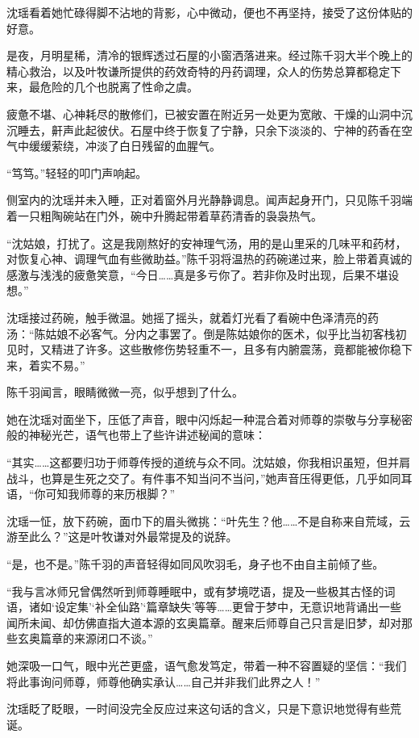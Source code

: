 沈瑶看着她忙碌得脚不沾地的背影，心中微动，便也不再坚持，接受了这份体贴的好意。

是夜，月明星稀，清冷的银辉透过石屋的小窗洒落进来。经过陈千羽大半个晚上的精心救治，以及叶牧谦所提供的药效奇特的丹药调理，众人的伤势总算都稳定下来，最危险的几个也脱离了性命之虞。

疲惫不堪、心神耗尽的散修们，已被安置在附近另一处更为宽敞、干燥的山洞中沉沉睡去，鼾声此起彼伏。石屋中终于恢复了宁静，只余下淡淡的、宁神的药香在空气中缓缓萦绕，冲淡了白日残留的血腥气。

“笃笃。”轻轻的叩门声响起。

侧室内的沈瑶并未入睡，正对着窗外月光静静调息。闻声起身开门，只见陈千羽端着一只粗陶碗站在门外，碗中升腾起带着草药清香的袅袅热气。

“沈姑娘，打扰了。这是我刚熬好的安神理气汤，用的是山里采的几味平和药材，对恢复心神、调理气血有些微助益。”陈千羽将温热的药碗递过来，脸上带着真诚的感激与浅浅的疲惫笑意，“今日……真是多亏你了。若非你及时出现，后果不堪设想。”

沈瑶接过药碗，触手微温。她摇了摇头，就着灯光看了看碗中色泽清亮的药汤：“陈姑娘不必客气。分内之事罢了。倒是陈姑娘你的医术，似乎比当初客栈初见时，又精进了许多。这些散修伤势轻重不一，且多有内腑震荡，竟都能被你稳下来，着实不易。”

陈千羽闻言，眼睛微微一亮，似乎想到了什么。

她在沈瑶对面坐下，压低了声音，眼中闪烁起一种混合着对师尊的崇敬与分享秘密般的神秘光芒，语气也带上了些许讲述秘闻的意味：

“其实……这都要归功于师尊传授的道统与众不同。沈姑娘，你我相识虽短，但并肩战斗，也算是生死之交了。有件事不知当问不当问，”她声音压得更低，几乎如同耳语，“你可知我师尊的来历根脚？”

沈瑶一怔，放下药碗，面巾下的眉头微挑：“叶先生？他……不是自称来自荒域，云游至此么？”这是叶牧谦对外最常提及的说辞。

“是，也不是。”陈千羽的声音轻得如同风吹羽毛，身子也不由自主前倾了些。

“我与言冰师兄曾偶然听到师尊睡眠中，或有梦境呓语，提及一些极其古怪的词语，诸如‘设定集’‘补全仙路’‘篇章缺失’等等……更曾于梦中，无意识地背诵出一些闻所未闻、却仿佛直指大道本源的玄奥篇章。醒来后师尊自己只言是旧梦，却对那些玄奥篇章的来源闭口不谈。”

她深吸一口气，眼中光芒更盛，语气愈发笃定，带着一种不容置疑的坚信：“我们将此事询问师尊，师尊他确实承认……自己并非我们此界之人！”

沈瑶眨了眨眼，一时间没完全反应过来这句话的含义，只是下意识地觉得有些荒诞。

